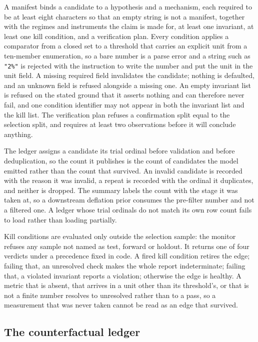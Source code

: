 A manifest binds a candidate to a hypothesis and a mechanism, each required to be at least eight characters so that an empty string is not a manifest, together with the regimes and instruments the claim is made for, at least one invariant, at least one kill condition, and a verification plan. Every condition applies a comparator from a closed set to a threshold that carries an explicit unit from a ten-member enumeration, so a bare number is a parse error and a string such as \texttt{"2\%"} is rejected with the instruction to write the number and put the unit in the unit field. A missing required field invalidates the candidate; nothing is defaulted, and an unknown field is refused alongside a missing one. An empty invariant list is refused on the stated ground that it asserts nothing and can therefore never fail, and one condition identifier may not appear in both the invariant list and the kill list. The verification plan refuses a confirmation split equal to the selection split, and requires at least two observations before it will conclude anything.

The ledger assigns a candidate its trial ordinal before validation and before deduplication, so the count it publishes is the count of candidates the model emitted rather than the count that survived. An invalid candidate is recorded with the reason it was invalid, a repeat is recorded with the ordinal it duplicates, and neither is dropped. The summary labels the count with the stage it was taken at, so a downstream deflation prior consumes the pre-filter number and not a filtered one. A ledger whose trial ordinals do not match its own row count fails to load rather than loading partially.

Kill conditions are evaluated only outside the selection sample: the monitor refuses any sample not named as test, forward or holdout. It returns one of four verdicts under a precedence fixed in code. A fired kill condition retires the edge; failing that, an unresolved check makes the whole report indeterminate; failing that, a violated invariant reports a violation; otherwise the edge is healthy. A metric that is absent, that arrives in a unit other than its threshold's, or that is not a finite number resolves to unresolved rather than to a pass, so a measurement that was never taken cannot be read as an edge that survived.

\subsection{The counterfactual ledger}\label{sec:counterfactual}

